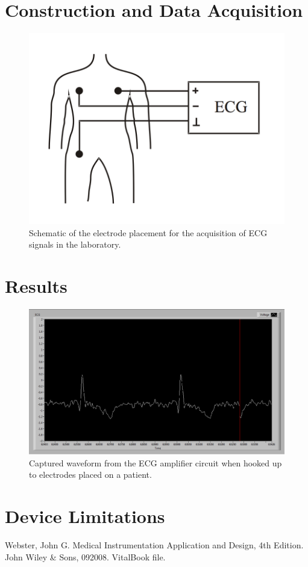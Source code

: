\documentclass[pdftex,12pt,letterpaper]{article}
\begin{document}
\section{Construction and Data Acquisition}

\begin{figure}[H]
\begin{center}
\includegraphics[scale=.5]{setup.png}
\caption{Schematic of the electrode placement for the acquisition of ECG signals in the laboratory.}
\label{fig:setup}
\end{center}
\end{figure}

\section{Results}

\begin{figure}[H]
\begin{center}
\includegraphics[scale=.4]{ECG_real.png}
\caption{Captured waveform from the ECG amplifier circuit when hooked up to electrodes placed on a patient.}
\label{fig:ECG}
\end{center}
\end{figure}

\section{Device Limitations}

\begin{thebibliography}{1}

Webster, John G. Medical Instrumentation Application and Design, 4th Edition. John Wiley \& Sons, 092008. VitalBook file.

\end{thebibliography}
\end{document}
